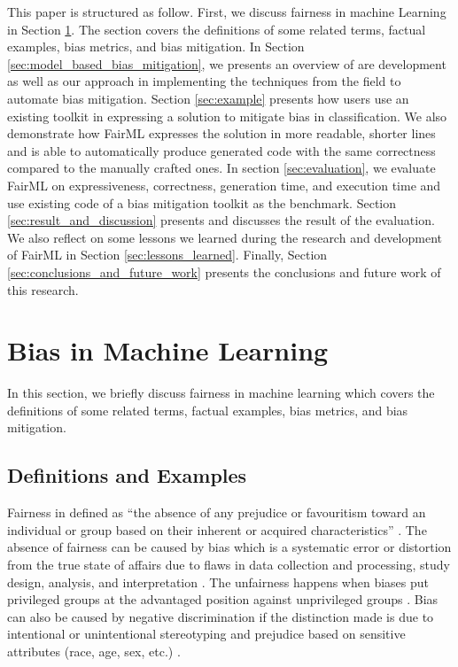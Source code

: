 \documentclass[sigconf,review]{acmart}
\begin{document}
This paper is structured as follow. First, we discuss fairness in machine Learning in Section \ref{sec:bias_in_machine_learning}. The section covers the definitions of some related terms, factual examples, bias metrics, and bias mitigation. In Section \ref{sec:model_based_bias_mitigation}, we presents an overview of are development as well as our approach in implementing the techniques from the field to automate bias mitigation. Section \ref{sec:example} presents how users use an existing toolkit in expressing a solution to mitigate bias in classification. We also demonstrate how FairML expresses the solution in more readable, shorter lines and is able to automatically produce generated code with the same correctness compared to the manually crafted ones. In section \ref{sec:evaluation}, we evaluate FairML on expressiveness, correctness, generation time, and execution time and use existing code of a bias mitigation toolkit as the benchmark. Section \ref{sec:result_and_discussion} presents and discusses the result of the evaluation. We also reflect on some lessons we learned during the research and development of FairML in Section \ref{sec:lessons_learned}. Finally, Section \ref{sec:conclusions_and_future_work} presents the conclusions and future work of this research.

\section{Bias in Machine Learning}
\label{sec:bias_in_machine_learning}
In this section, we briefly discuss fairness in machine learning which covers the definitions of some related terms, factual examples, bias metrics, and bias mitigation.

\subsection{Definitions and Examples}
\label{sec:definitions_and_examples}

Fairness in defined as ``the absence of any prejudice or favouritism toward an individual or
group based on their inherent or acquired characteristics'' \cite{mehrabi2021survey}.
The absence of fairness can be caused by bias which is a systematic error or distortion from the true state of affairs due to flaws in data collection and processing, study design, analysis, and interpretation \cite{oxford2022bias}. 
The unfairness happens when biases put privileged groups at the advantaged position against unprivileged groups \cite{bellamy2018ai}. 
Bias can also be caused by negative discrimination if the distinction made is due to intentional or unintentional stereotyping and prejudice based on sensitive attributes (race, age, sex, etc.) \cite{mehrabi2021survey,chen2019fairness}. 
\end{document}
